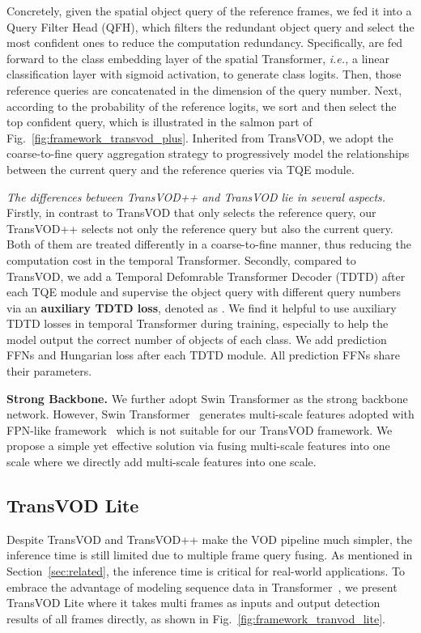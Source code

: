 \documentclass[10pt,journal,compsoc]{IEEEtran}
\begin{document}
Concretely, given the spatial object query  of the reference frames, we fed it into a Query Filter Head (QFH), which filters the redundant object query and select the most confident ones to reduce the computation redundancy. Specifically,  are fed forward to the class embedding layer of the spatial Transformer, \emph{i.e.,} a linear classification layer with sigmoid activation, to generate class logits. Then, those reference queries are concatenated in the dimension of the query number. Next, according to the probability of the reference logits, we sort and then select the top  confident query, which is illustrated in the salmon part of Fig.~\ref{fig:framework_transvod_plus}. Inherited from TransVOD, we adopt the coarse-to-fine query aggregation strategy to progressively model the relationships between the current query and the reference queries via TQE module.


\textit{The differences between TransVOD++ and TransVOD lie in several aspects.}
Firstly, in contrast to TransVOD that only selects the reference query, our TransVOD++ selects not only the reference query but also the current query. Both of them are treated differently in a coarse-to-fine manner, thus reducing the computation cost in the temporal Transformer. Secondly, compared to TransVOD, we add a Temporal Defomrable Transformer Decoder (TDTD) after each TQE module and supervise the object query with different query numbers via an \textbf{auxiliary TDTD loss}, denoted as . We find it helpful to use auxiliary TDTD losses  in temporal Transformer during training, especially to help the model output the correct number of objects of each class. We add prediction FFNs and Hungarian loss after each TDTD module. All prediction FFNs share their parameters. 



\noindent
\textbf{Strong Backbone.} We further adopt Swin Transformer as the strong backbone network. However, Swin Transformer~\cite{liu2021swin} generates multi-scale features adopted with FPN-like framework~\cite{he17maskrcnn} which is not suitable for our TransVOD framework. We propose a simple yet effective solution via fusing multi-scale features into one scale where we directly add multi-scale features into one scale.

\subsection{TransVOD Lite}
\label{sec:TransVOD_lite}
Despite TransVOD and TransVOD++ make the VOD pipeline much simpler, the inference time is still limited due to multiple frame query fusing. As mentioned in Section~\ref{sec:related}, the inference time is critical for real-world applications. To embrace the advantage of modeling sequence data in Transformer~\cite{vaswani2017attention,wang2020end}, we present TransVOD Lite where it takes multi frames as inputs and output detection results of all frames directly, as shown in Fig.~\ref{fig:framework_tranvod_lite}. 
\end{document}
